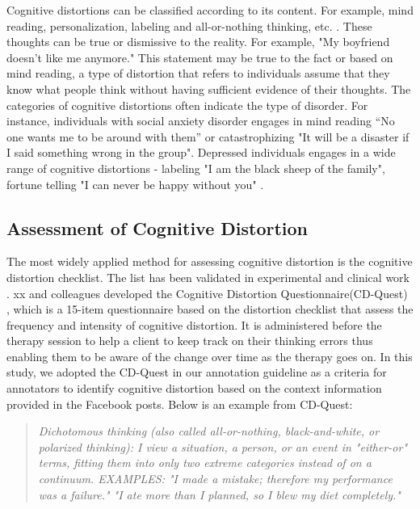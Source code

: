 Cognitive distortions can be classified according to its content. For example, mind reading, personalization, labeling and all-or-nothing thinking, etc. \cite{Oliveira14}. These thoughts can be true or dismissive to the reality. For example, "My boyfriend doesn't like me anymore." This statement may be true to the fact or based on mind reading, a type of distortion that refers to individuals assume that they know what people think without having sufficient evidence of their thoughts. The categories of cognitive distortions often indicate the type of disorder. For instance, individuals with social anxiety disorder engages in mind reading “No one wants me to be around with them” or catastrophizing "It will be a disaster if I said something wrong in the group".  Depressed individuals engages in a wide range of cognitive distortions - labeling "I am the black sheep of the family", fortune telling "I can never be happy without you" \cite{Newman15}. 

\subsection{Assessment of Cognitive Distortion}

The most widely applied method for assessing cognitive distortion is the cognitive distortion checklist. The list has been validated in experimental and clinical work \cite{Beck11,Dobson09}. xx and colleagues developed the Cognitive Distortion Questionnaire(CD-Quest) \cite{Simona17}, which is a 15-item questionnaire based on the distortion checklist that assess the frequency and intensity of cognitive distortion. It is administered before the therapy session to help a client to keep track on their thinking errors thus enabling them to be aware of the change over time as the therapy goes on. In this study, we adopted the CD-Quest in our annotation guideline as a criteria for annotators to identify cognitive distortion based on the context information provided in the Facebook posts. Below is an example from CD-Quest:

\begin{quote}
\textit{Dichotomous thinking (also called all-or-nothing, black-and-white, or
polarized thinking): I view a situation, a person, or an event in "either-or"
terms, fitting them into only two extreme categories instead of on a continuum.
EXAMPLES: "I made a mistake; therefore my performance was a failure." "I ate
more than I planned, so I blew my diet completely."}
\end{quote}

